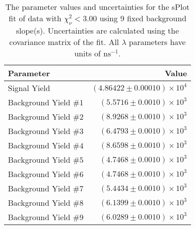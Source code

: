 
\begin{table}
    \begin{center}
        \begin{tabular}{lr}\toprule
            Parameter & Value \\\midrule
            Signal Yield & $(4.86422 \pm 0.00010) \times 10^{4}$ \\
            Background Yield $\#1$ & $(5.5716 \pm 0.0010) \times 10^{3}$ \\
            Background Yield $\#2$ & $(8.9268 \pm 0.0010) \times 10^{3}$ \\
            Background Yield $\#3$ & $(6.4793 \pm 0.0010) \times 10^{3}$ \\
            Background Yield $\#4$ & $(8.6598 \pm 0.0010) \times 10^{3}$ \\
            Background Yield $\#5$ & $(4.7468 \pm 0.0010) \times 10^{3}$ \\
            Background Yield $\#6$ & $(4.7468 \pm 0.0010) \times 10^{3}$ \\
            Background Yield $\#7$ & $(5.4434 \pm 0.0010) \times 10^{3}$ \\
            Background Yield $\#8$ & $(6.1399 \pm 0.0010) \times 10^{3}$ \\
            Background Yield $\#9$ & $(6.0289 \pm 0.0010) \times 10^{3}$ \\\bottomrule
        \end{tabular}
        \caption{The parameter values and uncertainties for the sPlot fit of data with $\chi^2_\nu < 3.00$ using 9 fixed background slope(s). Uncertainties are calculated using the covariance matrix of the fit. All $\lambda$ parameters have units of $\si{\nano\second}^{-1}$.}
    \end{center}
\end{table}
